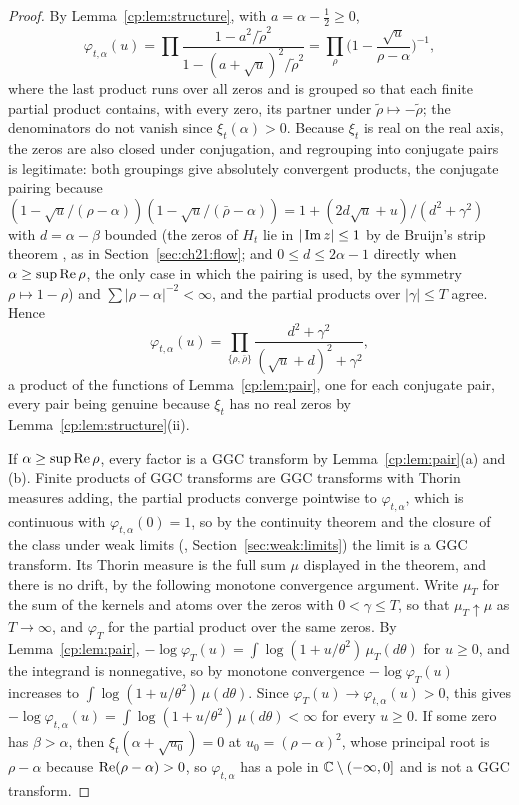\begin{proof}
By Lemma~\ref{cp:lem:structure}, with $a=\alpha-\frac12\ge0$,
\[
\varphi_{t,\alpha}(u)=\prod\frac{1-a^2/\tilde\rho^2}{1-(a+\sqrt u)^2/\tilde\rho^2}=\prod_\rho\Big(1-\frac{\sqrt u}{\rho-\alpha}\Big)^{-1},
\]
where the last product runs over all zeros and is grouped so that each finite partial product contains, with every zero, its partner under $\tilde\rho\mapsto-\tilde\rho$; the denominators do not vanish since $\xi_t(\alpha)>0$. Because $\xi_t$ is real on the real axis, the zeros are also closed under conjugation, and regrouping into conjugate pairs is legitimate: both groupings give absolutely convergent products, the conjugate pairing because $(1-\sqrt u/(\rho-\alpha))(1-\sqrt u/(\bar\rho-\alpha))=1+(2d\sqrt u+u)/(d^2+\gamma^2)$ with $d=\alpha-\beta$ bounded (the zeros of $H_t$ lie in $|\operatorname{Im} z|\le1$ by de Bruijn's strip theorem \cite[Theorem 13]{deBruijn}, as in Section~\ref{sec:ch21:flow}; and $0\le d\le2\alpha-1$ directly when $\alpha\ge\sup\operatorname{Re}\rho$, the only case in which the pairing is used, by the symmetry $\rho\mapsto1-\rho$) and $\sum|\rho-\alpha|^{-2}<\infty$, and the partial products over $|\gamma|\le T$ agree. Hence
\[
\varphi_{t,\alpha}(u)=\prod_{\{\rho,\bar\rho\}}\frac{d^2+\gamma^2}{(\sqrt u+d)^2+\gamma^2},
\]
a product of the functions of Lemma~\ref{cp:lem:pair}, one for each conjugate pair, every pair being genuine because $\xi_t$ has no real zeros by Lemma~\ref{cp:lem:structure}(ii).

If $\alpha\ge\sup\operatorname{Re}\rho$, every factor is a GGC transform by Lemma~\ref{cp:lem:pair}(a) and (b). Finite products of GGC transforms are GGC transforms with Thorin measures adding, the partial products converge pointwise to $\varphi_{t,\alpha}$, which is continuous with $\varphi_{t,\alpha}(0)=1$, so by the continuity theorem and the closure of the class under weak limits (\cite[Theorem~3.1.5]{Bondesson}, Section~\ref{sec:weak:limits}) the limit is a GGC transform. Its Thorin measure is the full sum $\mu$ displayed in the theorem, and there is no drift, by the following monotone convergence argument. Write $\mu_T$ for the sum of the kernels and atoms over the zeros with $0<\gamma\le T$, so that $\mu_T\uparrow\mu$ as $T\to\infty$, and $\varphi_T$ for the partial product over the same zeros. By Lemma~\ref{cp:lem:pair}, $-\log\varphi_T(u)=\int\log(1+u/\theta^2)\,\mu_T(d\theta)$ for $u\ge0$, and the integrand is nonnegative, so by monotone convergence $-\log\varphi_T(u)$ increases to $\int\log(1+u/\theta^2)\,\mu(d\theta)$. Since $\varphi_T(u)\to\varphi_{t,\alpha}(u)>0$, this gives $-\log\varphi_{t,\alpha}(u)=\int\log(1+u/\theta^2)\,\mu(d\theta)<\infty$ for every $u\ge0$. If some zero has $\beta>\alpha$, then $\xi_t(\alpha+\sqrt{u_0})=0$ at $u_0=(\rho-\alpha)^2$, whose principal root is $\rho-\alpha$ because $\operatorname{Re}(\rho-\alpha)>0$, so $\varphi_{t,\alpha}$ has a pole in $\mathbb{C}\setminus(-\infty,0]$ and is not a GGC transform.
\end{proof}

